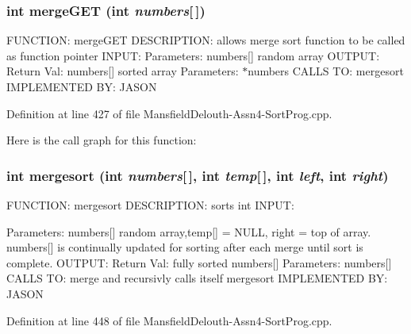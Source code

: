 \hypertarget{_mansfield_delouth-_assn4-_sort_prog_8cpp_a5bf887ba10188a54f08008fba4edd364}{
\subsubsection[{mergeGET}]{\setlength{\rightskip}{0pt plus 5cm}int mergeGET (int {\em numbers}\mbox{[}$\,$\mbox{]})}}
\label{_mansfield_delouth-_assn4-_sort_prog_8cpp_a5bf887ba10188a54f08008fba4edd364}
FUNCTION: mergeGET DESCRIPTION: allows merge sort function to be called as function pointer INPUT: Parameters: numbers\mbox{[}\mbox{]} random array OUTPUT: Return Val: numbers\mbox{[}\mbox{]} sorted array Parameters: $\ast$numbers CALLS TO: mergesort IMPLEMENTED BY: JASON 

Definition at line 427 of file MansfieldDelouth-\/Assn4-\/SortProg.cpp.



Here is the call graph for this function:

\hypertarget{_mansfield_delouth-_assn4-_sort_prog_8cpp_a5f5d9f539f726c766f4c454c579f2f6d}{
\subsubsection[{mergesort}]{\setlength{\rightskip}{0pt plus 5cm}int mergesort (int {\em numbers}\mbox{[}$\,$\mbox{]}, \/  int {\em temp}\mbox{[}$\,$\mbox{]}, \/  int {\em left}, \/  int {\em right})}}
\label{_mansfield_delouth-_assn4-_sort_prog_8cpp_a5f5d9f539f726c766f4c454c579f2f6d}
FUNCTION: mergesort DESCRIPTION: sorts int INPUT:

Parameters: numbers\mbox{[}\mbox{]} random array,temp\mbox{[}\mbox{]} = NULL, right = top of array. numbers\mbox{[}\mbox{]} is continually updated for sorting after each merge until sort is complete. OUTPUT: Return Val: fully sorted numbers\mbox{[}\mbox{]} Parameters: numbers\mbox{[}\mbox{]} CALLS TO: merge and recursivly calls itself mergesort IMPLEMENTED BY: JASON 

Definition at line 448 of file MansfieldDelouth-\/Assn4-\/SortProg.cpp.



